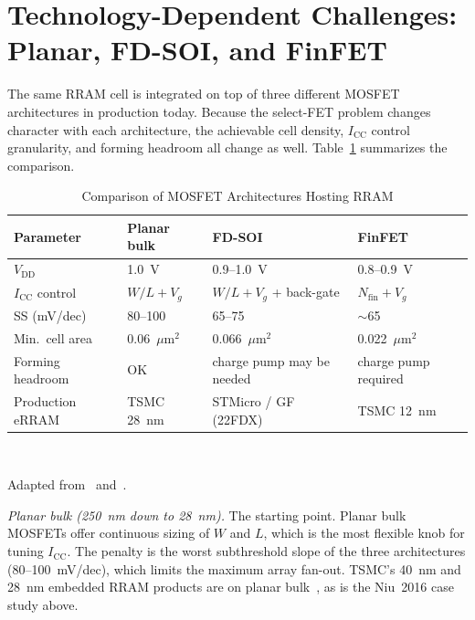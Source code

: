\documentclass[lettersize,journal]{IEEEtran}
\begin{document}
\section{Technology-Dependent Challenges: Planar, FD-SOI, and FinFET}\label{sec:tech}
The same RRAM cell is integrated on top of three different MOSFET architectures in production today. Because the select-FET problem changes character with each architecture, the achievable cell density, $I_\mathrm{CC}$ control granularity, and forming headroom all change as well. Table~\ref{tab:arch} summarizes the comparison.

\begin{table}[!t]
\caption{Comparison of MOSFET Architectures Hosting RRAM\label{tab:arch}}
\centering
\scriptsize
\renewcommand{\arraystretch}{1.2}
\begin{tabular}{|p{0.78in}|p{0.55in}|p{0.85in}|p{0.65in}|}
\hline
\textbf{Parameter} & \textbf{Planar bulk} & \textbf{FD-SOI} & \textbf{FinFET} \\
\hline
$V_\mathrm{DD}$ & 1.0~V & 0.9--1.0~V & 0.8--0.9~V \\
\hline
$I_\mathrm{CC}$ control & $W/L + V_g$ & $W/L + V_g$ + back-gate & $N_\mathrm{fin} + V_g$ \\
\hline
SS (mV/dec) & 80--100 & 65--75 & $\sim$65 \\
\hline
Min.\ cell area & 0.06~$\mu$m$^2$ & 0.066~$\mu$m$^2$ & 0.022~$\mu$m$^2$ \\
\hline
Forming headroom & OK & charge pump may be needed & charge pump required \\
\hline
Production eRRAM & TSMC 28~nm & STMicro / GF (22FDX) & TSMC 12~nm \\
\hline
\end{tabular}
\\[2pt]
\raggedright Adapted from~\cite{ref_ielmini2016} and~\cite{ref_hellenbrand2024}.
\end{table}

\textit{Planar bulk (250~nm down to 28~nm).} The starting point. Planar bulk MOSFETs offer continuous sizing of $W$ and $L$, which is the most flexible knob for tuning $I_\mathrm{CC}$. The penalty is the worst subthreshold slope of the three architectures (80--100~mV/dec), which limits the maximum array fan-out. TSMC's 40~nm and 28~nm embedded RRAM products are on planar bulk~\cite{ref_chou2018,ref_hellenbrand2024}, as is the Niu~2016 case study above.
\end{document}
